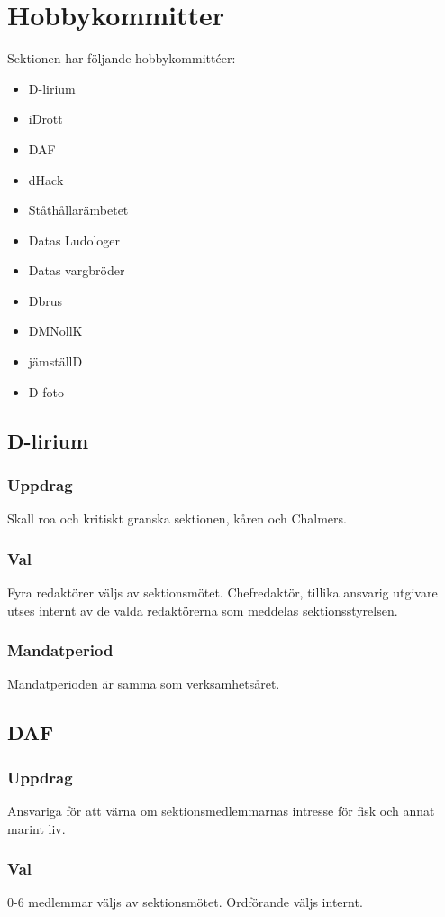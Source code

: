 \section{Hobbykommitter}
Sektionen har följande hobbykommittéer:
\begin{itemize}
  \item D-lirium 
  \item iDrott 
  \item DAF 
  \item dHack
  \item Ståthållarämbetet
  \item Datas Ludologer 
  \item Datas vargbröder
  \item Dbrus
  \item DMNollK
  \item jämställD
  \item D-foto
\end{itemize}
\subsection{D-lirium}
\subsubsection{Uppdrag}
Skall roa och kritiskt granska sektionen, kåren och Chalmers. 
\subsubsection{Val}
Fyra redaktörer väljs av sektionsmötet. Chefredaktör, tillika ansvarig utgivare utses internt av de valda redaktörerna som meddelas sektionsstyrelsen. 
\subsubsection{Mandatperiod}
Mandatperioden är samma som verksamhetsåret. 

\subsection{DAF}
\subsubsection{Uppdrag}
Ansvariga för att värna om sektionsmedlemmarnas intresse för fisk och
annat marint liv.
\subsubsection{Val}
0-6 medlemmar väljs av sektionsmötet. Ordförande väljs internt.
